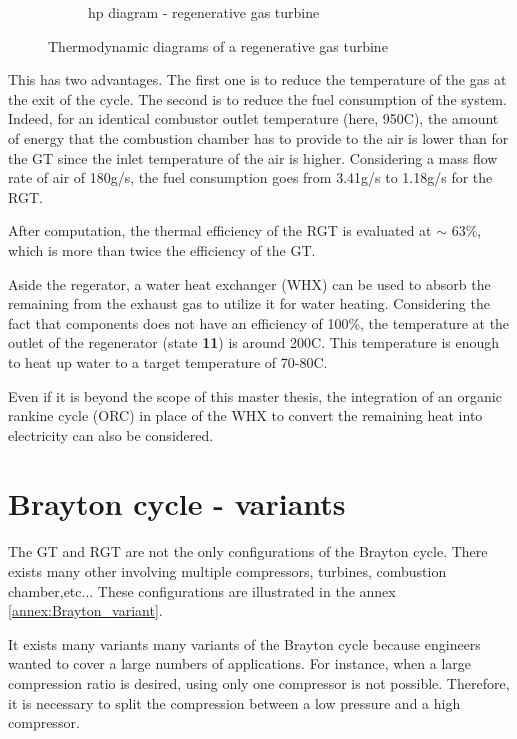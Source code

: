 \begin{figure}[h]
\begin{subfigure}[b]{0.4\textwidth}
         \caption{hp diagram - regenerative gas turbine}
         \label{fig:C5_hp_RGT}
     \end{subfigure}
        \caption{Thermodynamic diagrams of a regenerative gas turbine}
        \label{fig:C5_thermo_diagram_RGT}
\end{figure}
\newpage
This has two advantages. The first one is to reduce the temperature of the gas at the exit of the cycle. The second is to reduce the fuel consumption of the system. Indeed, for an identical combustor outlet temperature (here, 950\degree C), the amount of energy that the combustion chamber has to provide to the air is lower than for the GT since the inlet temperature of the air is higher. Considering a mass flow rate of air of 180g/s, the fuel consumption goes from 3.41g/s to 1.18g/s for the RGT.

After computation, the thermal efficiency of the RGT is evaluated at $\sim$ 63\%, which is more than twice the efficiency of the GT.

Aside the regerator, a water heat exchanger (WHX) can be used to absorb the remaining from the exhaust gas to utilize it for water heating. Considering the fact that components does not have an efficiency of 100\%, the temperature at the outlet of the regenerator (state \textbf{11}) is around 200\degree C. This temperature is enough to heat up water to a target temperature of 70-80\degree C.

Even if it is beyond the scope of this master thesis, the integration of an organic rankine cycle (ORC) in place of the WHX to convert the remaining heat into electricity can also be considered\citep{Quoilin2008}.

\section{Brayton cycle - variants}
The GT and RGT are not the only configurations of the Brayton cycle. There exists many other involving multiple compressors, turbines, combustion chamber,etc... These configurations are illustrated in the annex \ref{annex:Brayton_variant}.

It exists many variants many variants of the Brayton cycle because engineers wanted to cover a large numbers of applications. For instance, when a large compression ratio is desired, using only one compressor is not possible. Therefore, it is necessary to split the compression between a low pressure and a high compressor. 
